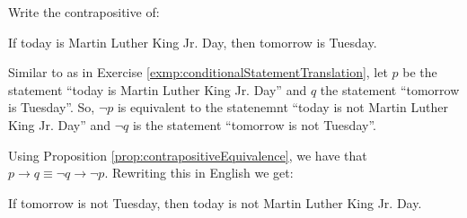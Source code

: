 \guard




\begin{exmp}
\label{exmp:contrapositiveStatementTranslation}
  Write the contrapositive of:
  \begin{center}
    If today is Martin Luther King Jr. Day, then tomorrow is Tuesday.
  \end{center}

  Similar to as in Exercise \ref{exmp:conditionalStatementTranslation}, let $p$ be the statement ``today is Martin Luther King Jr. Day'' and $q$ the statement ``tomorrow is Tuesday''.
  So, $\neg p$ is equivalent to the statenemnt ``today is not Martin Luther King Jr. Day'' and $\neg q$ is the statement ``tomorrow is not Tuesday''.

  Using Proposition \ref{prop:contrapositiveEquivalence}, we have that $p\rightarrow q \equiv \neg q \rightarrow \neg p$.
  Rewriting this in English we get:
  \begin{center}
    If tomorrow is not Tuesday, then today is not Martin Luther King Jr. Day.
  \end{center}
\end{exmp}
